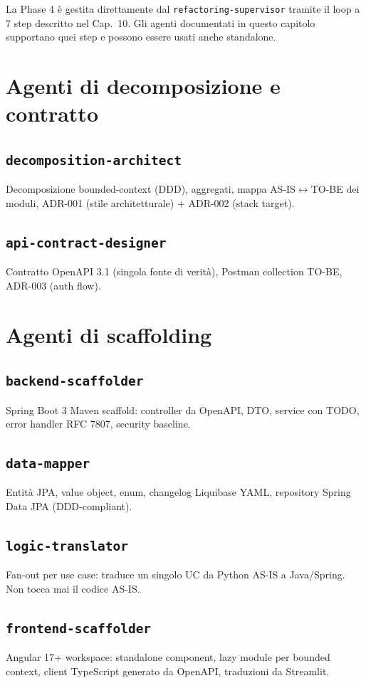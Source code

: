 \documentclass[12pt,a4paper,twoside]{book}
\begin{document}
La Phase 4 è gestita direttamente dal \texttt{refactoring-supervisor} tramite il loop a 7 step descritto nel Cap.~10. Gli agenti documentati in questo capitolo supportano quei step e possono essere usati anche standalone.

\section{Agenti di decomposizione e contratto}

\subsection{\texttt{decomposition-architect}}
Decomposizione bounded-context (DDD), aggregati, mappa AS-IS$\leftrightarrow$TO-BE dei moduli, ADR-001 (stile architetturale) + ADR-002 (stack target).

\subsection{\texttt{api-contract-designer}}
Contratto OpenAPI 3.1 (singola fonte di verità), Postman collection TO-BE, ADR-003 (auth flow).

\section{Agenti di scaffolding}

\subsection{\texttt{backend-scaffolder}}
Spring Boot 3 Maven scaffold: controller da OpenAPI, DTO, service con TODO, error handler RFC 7807, security baseline.

\subsection{\texttt{data-mapper}}
Entità JPA, value object, enum, changelog Liquibase YAML, repository Spring Data JPA (DDD-compliant).

\subsection{\texttt{logic-translator}}
Fan-out per use case: traduce un singolo UC da Python AS-IS a Java/Spring. Non tocca mai il codice AS-IS.

\subsection{\texttt{frontend-scaffolder}}
Angular 17+ workspace: standalone component, lazy module per bounded context, client TypeScript generato da OpenAPI, traduzioni da Streamlit.
\end{document}
